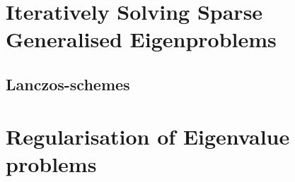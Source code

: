 \section{Iteratively Solving Sparse Generalised Eigenproblems}
\label{app:ghep}

\subsection{Lanczos-schemes}

\section{Regularisation of Eigenvalue problems}
\label{app:regular}

